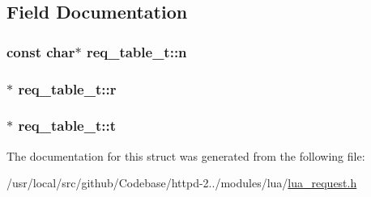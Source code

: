 \subsection{Field Documentation}
\subsubsection[{\texorpdfstring{n}{n}}]{\setlength{\rightskip}{0pt plus 5cm}const char$\ast$ req\+\_\+table\+\_\+t\+::n}\hypertarget{structreq__table__t_a0e23b1ff47dd10e67523eed26ddde26d}{}\label{structreq__table__t_a0e23b1ff47dd10e67523eed26ddde26d}
\subsubsection[{\texorpdfstring{r}{r}}]{$\ast$ req\+\_\+table\+\_\+t\+::r}\hypertarget{structreq__table__t_a6e3dbb50859ac07a590b0b0ccc9a6e91}{}\label{structreq__table__t_a6e3dbb50859ac07a590b0b0ccc9a6e91}
\subsubsection[{\texorpdfstring{t}{t}}]{$\ast$ req\+\_\+table\+\_\+t\+::t}\hypertarget{structreq__table__t_a7a4d025a7e0edc9fb3c11fe64ad05817}{}\label{structreq__table__t_a7a4d025a7e0edc9fb3c11fe64ad05817}


The documentation for this struct was generated from the following file\+:\begin{DoxyCompactItemize}
\item 
/usr/local/src/github/\+Codebase/httpd-\/2../modules/lua/\hyperlink{lua__request_8h}{lua\+\_\+request.\+h}\end{DoxyCompactItemize}

